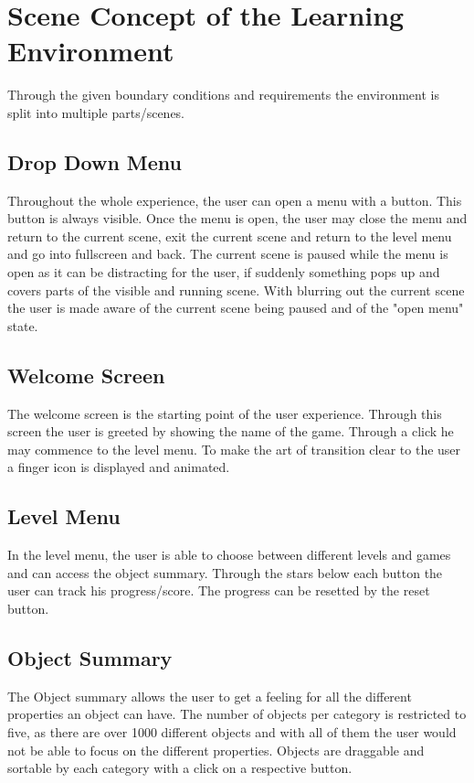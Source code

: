 \section{Scene Concept of the Learning Environment}\label{sec:scene-concept-of-the-learning-environment}
Through the given boundary conditions and requirements the environment is split into multiple parts/scenes.

\subsection{Drop Down Menu}\label{subsec:drop-down-menu}
Throughout the whole experience, the user can open a menu with a button.
This button is always visible.
Once the menu is open, the user may close the menu and return to the current scene,
exit the current scene and return to the level menu and go into fullscreen and back.
The current scene is paused while the menu is open as it can be distracting for the user,
if suddenly something pops up and covers parts of the visible and running scene.
With blurring out the current scene the user is made aware of the current scene being paused and of the "open menu" state.

\subsection{Welcome Screen}\label{subsec:welcome-screen}
The welcome screen is the starting point of the user experience.
Through this screen the user is greeted by showing the name of the game.
Through a click he may commence to the level menu.
To make the art of transition clear to the user a finger icon is displayed and animated.

\subsection{Level Menu}\label{subsec:level-menu}
In the level menu, the user is able to choose between different levels and games and can access the object summary.
Through the stars below each button the user can track his progress/score.
The progress can be resetted by the reset button.

\subsection{Object Summary}\label{subsec:object-summary}
The Object summary allows the user to get a feeling for all the different properties an object can have.
The number of objects per category is restricted to five, as there are over 1000 different objects and with all of them
the user would not be able to focus on the different properties.
Objects are draggable and sortable by each category with a click on a respective button.

